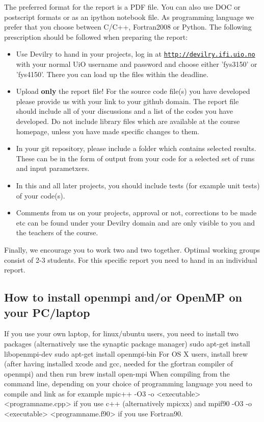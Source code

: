 \documentclass[%
oneside,                 %
final,                   %
10pt]{article}
\begin{document}
The preferred format for the report is a PDF file. You can also use DOC or postscript formats or as an ipython notebook file.  As programming language we prefer that you choose between C/C++, Fortran2008 or Python. The following prescription should be followed when preparing the report:

\begin{itemize}
  \item Use Devilry to hand in your projects, log in  at  \href{{http://devilry.ifi.uio.no}}{\nolinkurl{http://devilry.ifi.uio.no}} with your normal UiO username and password and choose either 'fys3150' or 'fys4150'. There you can load up the files within the deadline.

  \item Upload \textbf{only} the report file!  For the source code file(s) you have developed please provide us with your link to your github domain.  The report file should include all of your discussions and a list of the codes you have developed.  Do not include library files which are available at the course homepage, unless you have made specific changes to them.

  \item In your git repository, please include a folder which contains selected results. These can be in the form of output from your code for a selected set of runs and input parametxers.

  \item In this and all later projects, you should include tests (for example unit tests) of your code(s).

  \item Comments  from us on your projects, approval or not, corrections to be made  etc can be found under your Devilry domain and are only visible to you and the teachers of the course.
\end{itemize}

\noindent
Finally, 
we encourage you to work two and two together. Optimal working groups consist of 
2-3 students. For this specific report you need to hand in an individual report.



\subsection{How to install openmpi and/or OpenMP on your PC/laptop}

If you use your own laptop, for linux/ubuntu users, you need to install two packages (alternatively use the synaptic package manager)
\bvrb
  sudo apt-get install libopenmpi-dev
  sudo apt-get install openmpi-bin
\evrb
For OS X users, install brew (after having installed xcode and gcc, needed for the 
gfortran compiler of openmpi) and then run
\bvrb
brew install open-mpi
\evrb
When compiling from the command line, depending on your choice of programming language you need to compile and link as for example
\bvrb
mpic++ -O3 -o <executable> <programname.cpp>
\evrb
if you use c++ (alternatively mpicxx) and
\bvrb
mpif90 -O3 -o <executable> <programname.f90>
\evrb
if you use Fortran90.
\end{document}
